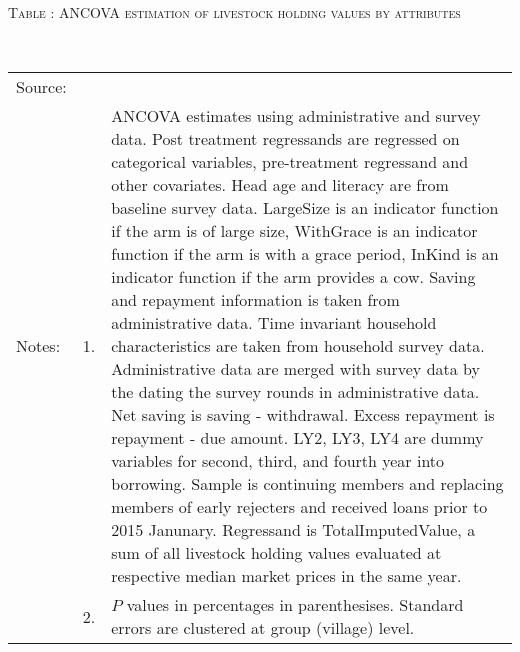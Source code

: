 \hspace{-1cm}\begin{minipage}[t]{14cm}
\hfil\textsc{\normalsize Table \thetable: ANCOVA estimation of livestock holding values by attributes\label{tab ANCOVA livestock attributes}}\\
\setlength{\tabcolsep}{1pt}
\setlength{\baselineskip}{8pt}
\renewcommand{\arraystretch}{.55}
\hfil{}\\
\renewcommand{\arraystretch}{.8}
\setlength{\tabcolsep}{1pt}
\begin{tabular}{>{\hfill\scriptsize}p{1cm}<{}>{\hfill\scriptsize}p{.25cm}<{}>{\scriptsize}p{12cm}<{\hfill}}
Source:& \multicolumn{2}{l}{\scriptsize Estimated with GUK administrative and survey data.}\\
Notes: & 1. & ANCOVA estimates using administrative and survey data. Post treatment regressands are regressed on categorical variables, pre-treatment regressand and other covariates. Head age and literacy are from baseline survey data.  \textsf{LargeSize} is an indicator function if the arm is of large size, \textsf{WithGrace} is an indicator function if the arm is with a grace period, \textsf{InKind} is an indicator function if the arm provides a cow. Saving and repayment information is taken from administrative data. Time invariant household characteristics are taken from household survey data. Administrative data are merged with survey data by the dating the survey rounds in administrative data. Net saving is saving - withdrawal. Excess repayment is repayment - due amount. \textsf{LY2, LY3, LY4} are dummy variables for second, third, and 	fourth year into borrowing. Sample is continuing members and replacing members of early rejecters and received loans prior to 2015 Janunary. Regressand is \textsf{TotalImputedValue}, a sum of all livestock holding values evaluated at respective median market prices in the same year. \\
& 2. & $P$ values in percentages in parenthesises. Standard errors are clustered at group (village) level.
\end{tabular}
\end{minipage}




